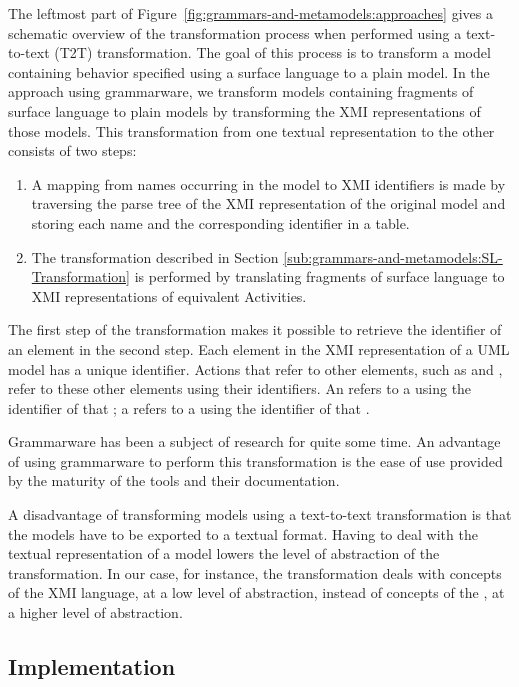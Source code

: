 The leftmost part of Figure~\ref{fig:grammars-and-metamodels:approaches} gives a schematic overview of the transformation process when performed using a text-to-text (T2T) transformation.
The goal of this process is to transform a \UML model containing behavior specified using a surface language to a plain \UML model.
In the approach using grammarware, we transform models containing fragments of surface language to plain \UML models by transforming the XMI \cite{XMIspec} representations of those models.
This transformation from one textual representation to the other consists of two steps:
\begin{enumerate}
\item A mapping from names occurring in the model to XMI identifiers is made by traversing the parse tree of the XMI representation of the original model and storing each name and the corresponding identifier in a table.
\item The transformation described in Section \ref{sub:grammars-and-metamodels:SL-Transformation} is performed by translating fragments of surface language to XMI representations of equivalent Activities.
\end{enumerate}
The first step of the transformation makes it possible to retrieve the identifier of an element in the second step.
Each element in the XMI representation of a UML model has a unique identifier.
Actions that refer to other elements, such as \AddVariableValueActions and \CreateObjectActions, refer to these other elements using their identifiers.
An \AddVariableValueAction refers to a \Variable using the identifier of that \Variable; a \CreateObjectAction refers to a \Classifier using the identifier of that \Classifier.

Grammarware has been a subject of research for quite some time.
An advantage of using grammarware to perform this transformation is the ease of use provided by the maturity of the tools and their documentation.

A disadvantage of transforming models using a text-to-text transformation is that the models have to be exported to a textual format.
Having to deal with the textual representation of a model lowers the level of abstraction of the transformation.
In our case, for instance, the transformation deals with concepts of the XMI language, at a low level of abstraction, instead of concepts of the \UML, at a higher level of abstraction.


\subsection{Implementation}
\label{sub:grammars-and-metamodels:GW-Implementation}

